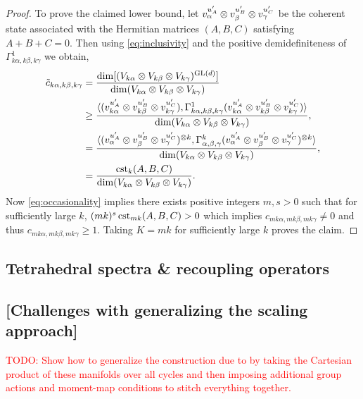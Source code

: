 \documentclass[notitlepage, 10pt]{article}
\begin{document}
\begin{proof}
    To prove the claimed lower bound, let $v_{\alpha}^{u_{A}'} \otimes v_{\beta}^{u_{B}'} \otimes v_{\gamma}^{u_{C}'}$ be the coherent state associated with the Hermitian matrices $(A,B,C)$ satisfying $A+B+C=0$.
    Then using \cref{eq:inclusivity} and the positive demidefiniteness of $\Gamma_{k\alpha,k\beta,k\gamma}^{1}$ we obtain,
    \begin{align}
        \label{eq:tilde_c_k_inclusivity}
        \begin{split}
            \tilde c_{k\alpha, k\beta, k\gamma} 
            &= \frac{\dim[(V_{k\alpha} \otimes V_{k\beta} \otimes V_{k\gamma})^{\operatorname{GL}(d)}]}{\dim(V_{k\alpha} \otimes V_{k\beta} \otimes V_{k\gamma})} \\
            &\geq \frac{\braket{(v_{k\alpha}^{u_A'} \otimes v_{k\beta}^{u_B'} \otimes v_{k\gamma}^{u_C'}), \Gamma_{k\alpha,k\beta,k\gamma}^{1} (v_{k\alpha}^{u_A'} \otimes v_{k\beta}^{u_B'} \otimes v_{k\gamma}^{u_C'})}}{\dim(V_{k\alpha} \otimes V_{k\beta} \otimes V_{k\gamma})}, \\
            &= \frac{\braket{(v_{\alpha}^{u_A'} \otimes v_{\beta}^{u_B'} \otimes v_{\gamma}^{u_C'})^{\otimes k}, \Gamma_{\alpha,\beta,\gamma}^{k} (v_{\alpha}^{u_A'} \otimes v_{\beta}^{u_B'} \otimes v_{\gamma}^{u_C'})^{\otimes k}}}{\dim(V_{k\alpha} \otimes V_{k\beta} \otimes V_{k\gamma})}, \\
            &= \frac{\operatorname{cst}_{k}(A,B,C)}{\dim(V_{k\alpha} \otimes V_{k\beta} \otimes V_{k\gamma})}.
        \end{split}
    \end{align}
    Now \cref{eq:occasionality} implies there exists positive integers $m,s > 0$ such that for sufficiently large $k$, $(mk)^{s} \operatorname{cst}_{mk}(A,B,C) > 0$ which implies $c_{mk\alpha, mk\beta, mk\gamma} \neq 0$ and thus $c_{mk\alpha, mk\beta, mk\gamma} \geq 1$. 
    Taking $K = mk$ for sufficiently large $k$ proves the claim. 
\end{proof}

\subsection{Tetrahedral spectra \& recoupling operators}
\label{sec:tetraspec}

\subsection{[Challenges with generalizing the scaling approach]}

\textcolor{red}{TODO: Show how to generalize the construction due to \citeauthor{roberts1999classical} \cite{roberts1999classical} by taking the Cartesian product of these manifolds over all cycles and then imposing additional group actions and moment-map conditions to stitch everything together.}
\end{document}
